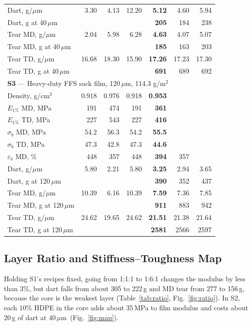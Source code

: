 \documentclass[conference,a4paper]{IEEEtran}
\newcommand{\um}{\,$\mu$m}
\begin{document}
\begin{table}[!t]
\begin{tabular}{lrrrrrr}
Dart, g/$\mu$m & 3.30 & 4.13 & 12.20 & \textbf{5.12} & 4.60 & 5.94 \\
\quad Dart, g at 40\,$\mu$m & & & & \textbf{205} & 184 & 238 \\
Tear MD, g/$\mu$m & 2.04 & 5.98 & 6.28 & \textbf{4.63} & 4.07 & 5.07 \\
\quad Tear MD, g at 40\,$\mu$m & & & & \textbf{185} & 163 & 203 \\
Tear TD, g/$\mu$m & 16.68 & 18.30 & 15.90 & \textbf{17.26} & 17.23 & 17.30 \\
\quad Tear TD, g at 40\,$\mu$m & & & & \textbf{691} & 689 & 692 \\
\midrule
\multicolumn{7}{l}{\textbf{S3} --- Heavy-duty FFS sack film, 120\,$\mu$m, 114.3 g/m$^2$} \\
\midrule
Density, g/cm$^3$ & 0.918 & 0.976 & 0.918 & \textbf{0.953} & & \\
$E_{1\%}$ MD, MPa & 191 & 474 & 191 & \textbf{361} &  & \\
$E_{1\%}$ TD, MPa & 227 & 543 & 227 & \textbf{416} &  & \\
$\sigma_b$ MD, MPa & 54.2 & 56.3 & 54.2 & \textbf{55.5} &  & \\
$\sigma_b$ TD, MPa & 47.3 & 42.8 & 47.3 & \textbf{44.6} &  & \\
$\varepsilon_b$ MD, \% & 448 & 357 & 448 & \textbf{394} & 357 & \\
Dart, g/$\mu$m & 5.80 & 2.21 & 5.80 & \textbf{3.25} & 2.94 & 3.65 \\
\quad Dart, g at 120\,$\mu$m & & & & \textbf{390} & 352 & 437 \\
Tear MD, g/$\mu$m & 10.39 & 6.16 & 10.39 & \textbf{7.59} & 7.36 & 7.85 \\
\quad Tear MD, g at 120\,$\mu$m & & & & \textbf{911} & 883 & 942 \\
Tear TD, g/$\mu$m & 24.62 & 19.65 & 24.62 & \textbf{21.51} & 21.38 & 21.64 \\
\quad Tear TD, g at 120\,$\mu$m & & & & \textbf{2581} & 2566 & 2597 \\
\bottomrule
\end{tabular}
\end{table}

\subsection{Layer Ratio and Stiffness--Toughness Map}
Holding S1's recipes fixed, going from 1:1:1 to 1:6:1 changes the modulus by less than 3\%, but dart falls from about 305 to 222\,g and MD tear from 277 to 156\,g, because the core is the weakest layer (Table~\ref{tab:ratio}, Fig.~\ref{fig:ratio}). In S2, each 10\% HDPE in the core adds about 35\,MPa to film modulus and costs about 20\,g of dart at 40\um\ (Fig.~\ref{fig:map}).
\end{document}
